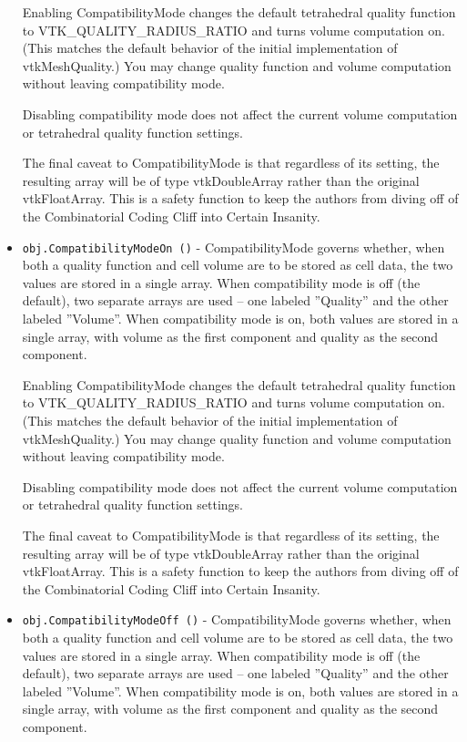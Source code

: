 \begin{itemize}
 Enabling CompatibilityMode changes the default tetrahedral
 quality function to VTK\_QUALITY\_RADIUS\_RATIO and turns volume
 computation on. (This matches the default behavior of the
 initial implementation of vtkMeshQuality.) You may change
 quality function and volume computation without leaving
 compatibility mode.

 Disabling compatibility mode does not affect the current
 volume computation or tetrahedral quality function settings. 

 The final caveat to CompatibilityMode is that regardless of
 its setting, the resulting array will be of type vtkDoubleArray
 rather than the original vtkFloatArray.
 This is a safety function to keep the authors from
 diving off of the Combinatorial Coding Cliff into
 Certain Insanity.

\item  \verb|obj.CompatibilityModeOn ()| -  CompatibilityMode governs whether, when both a quality function
 and cell volume are to be stored as cell data, the two values
 are stored in a single array. When compatibility mode is off
 (the default), two separate arrays are used -- one labeled
 ''Quality'' and the other labeled ''Volume''.
 When compatibility mode is on, both values are stored in a
 single array, with volume as the first component and quality
 as the second component.

 Enabling CompatibilityMode changes the default tetrahedral
 quality function to VTK\_QUALITY\_RADIUS\_RATIO and turns volume
 computation on. (This matches the default behavior of the
 initial implementation of vtkMeshQuality.) You may change
 quality function and volume computation without leaving
 compatibility mode.

 Disabling compatibility mode does not affect the current
 volume computation or tetrahedral quality function settings. 

 The final caveat to CompatibilityMode is that regardless of
 its setting, the resulting array will be of type vtkDoubleArray
 rather than the original vtkFloatArray.
 This is a safety function to keep the authors from
 diving off of the Combinatorial Coding Cliff into
 Certain Insanity.

\item  \verb|obj.CompatibilityModeOff ()| -  CompatibilityMode governs whether, when both a quality function
 and cell volume are to be stored as cell data, the two values
 are stored in a single array. When compatibility mode is off
 (the default), two separate arrays are used -- one labeled
 ''Quality'' and the other labeled ''Volume''.
 When compatibility mode is on, both values are stored in a
 single array, with volume as the first component and quality
 as the second component.


\end{itemize}
